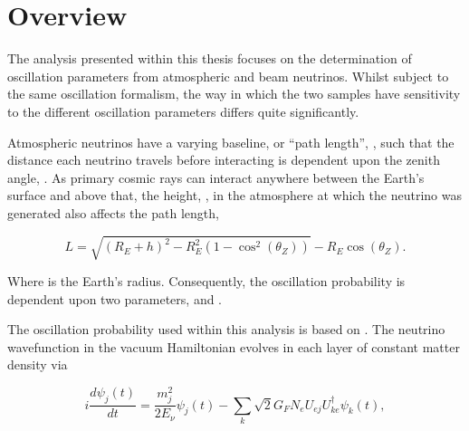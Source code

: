 \section{Overview}
\label{sec:Oscillation_Overview}


The analysis presented within this thesis focuses on the determination of oscillation parameters from atmospheric and beam neutrinos. Whilst subject to the same oscillation formalism, the way in which the two samples have sensitivity to the different oscillation parameters differs quite significantly.

Atmospheric neutrinos have a varying baseline, or ``path length'', , such that the distance each neutrino travels before interacting is dependent upon the zenith angle, . As primary cosmic rays can interact anywhere between the Earth's surface and  above that, the height, , in the atmosphere at which the neutrino was generated also affects the path length,

\begin{equation}
  L = \sqrt{\left(R_{E} + h\right)^{2} - R_{E}^{2} \left(1 - \cos^{2} \left(\theta_{Z} \right) \right)} - R_{E}\cos(\theta_{Z}).
\end{equation}

Where  is the Earth's radius. Consequently, the oscillation probability is dependent upon two parameters,  and .

The oscillation probability used within this analysis is based on \cite{Barger:1980tf}. The neutrino wavefunction in the vacuum Hamiltonian evolves in each layer of constant matter density via

\begin{equation}
  i \frac{d\psi_{j}(t)}{dt} = \frac{m_{j}^{2}}{2E_{\nu}} \psi_{j}(t) - \sum_{k} \sqrt{2} G_{F} N_{e} U_{ej} U_{ke}^{\dagger} \psi_{k}(t),
\end{equation}

